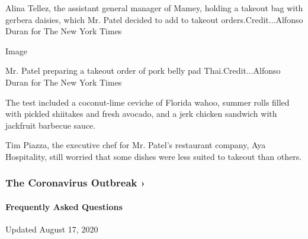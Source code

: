 Alina Tellez, the assistant general manager of Mamey, holding a takeout
bag with gerbera daisies, which Mr. Patel decided to add to takeout
orders.Credit...Alfonso Duran for The New York Times

Image

Mr. Patel preparing a takeout order of pork belly pad
Thai.Credit...Alfonso Duran for The New York Times

The test included a coconut-lime ceviche of Florida wahoo, summer rolls
filled with pickled shiitakes and fresh avocado, and a jerk chicken
sandwich with jackfruit barbecue sauce.

Tim Piazza, the executive chef for Mr. Patel's restaurant company, Aya
Hospitality, still worried that some dishes were less suited to takeout
than others.

\href{https://www.nytimes3xbfgragh.onion/news-event/coronavirus?action=click\&pgtype=Article\&state=default\&region=MAIN_CONTENT_3\&context=storylines_faq}{}

\hypertarget{the-coronavirus-outbreak-}{%
\subsubsection{The Coronavirus Outbreak
›}\label{the-coronavirus-outbreak-}}

\hypertarget{frequently-asked-questions}{%
\paragraph{Frequently Asked
Questions}\label{frequently-asked-questions}}

Updated August 17, 2020

